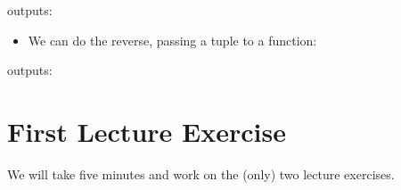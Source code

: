 \documentclass[letterpaper,10pt,english]{sphinxmanual}
\begin{document}
outputs:
\begin{quote}

\begin{sphinxVerbatim}[commandchars=\\\{\}]
        
\end{sphinxVerbatim}
\end{quote}
\begin{itemize}
\item {} 
We can do the reverse, passing a tuple to a function:

\begin{sphinxVerbatim}[commandchars=\\\{\}]
 
     \PYG{p}{[}\PYG{p}{]}    \PYG{p}{[}\PYG{p}{]}    \PYG{p}{[}\PYG{p}{]}

    
\end{sphinxVerbatim}

\end{itemize}

outputs:
\begin{quote}

\begin{sphinxVerbatim}[commandchars=\\\{\}]
\end{sphinxVerbatim}
\end{quote}


\section{First Lecture Exercise}
\label{\detokenize{lecture_notes/lec07_modules_images:first-lecture-exercise}}
We will take five minutes and work on the (only) two lecture exercises.
\end{document}
